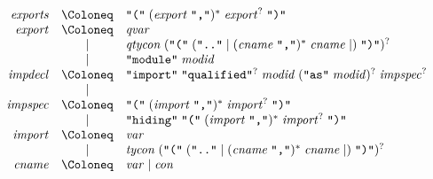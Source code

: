 \begin{align*}
  \begin{array}{rcl}
    \mathit{exports}
    & \Coloneq & \text{\texttt{\textquotedbl(\textquotedbl}}\; (\mathit{export}\; \text{\texttt{\textquotedbl,\textquotedbl}})^*\; \mathit{export}^?\; \text{\texttt{\textquotedbl)\textquotedbl}} \\
    \mathit{export}
    & \Coloneq & \mathit{qvar} \\
    & \mid & \mathit{qtycon}\; (\text{\texttt{\textquotedbl(\textquotedbl}}\; (\text{\texttt{\textquotedbl..\textquotedbl}} \mid (\mathit{cname}\; \text{\texttt{\textquotedbl,\textquotedbl}})^*\; \mathit{cname} \mid )\; \text{\texttt{\textquotedbl)\textquotedbl}})^? \\
    & \mid & \text{\texttt{\textquotedbl module\textquotedbl}}\; \mathit{modid} \\
    \mathit{impdecl}
    & \Coloneq & \text{\texttt{\textquotedbl import\textquotedbl}}\; \text{\texttt{\textquotedbl qualified\textquotedbl}}^?\; \mathit{modid}\; (\text{\texttt{\textquotedbl as\textquotedbl}}\; \mathit{modid})^?\; \mathit{impspec}^? \\
    & \mid & \\
    \mathit{impspec}
    & \Coloneq & \text{\texttt{\textquotedbl(\textquotedbl}}\; (\mathit{import}\; \text{\texttt{\textquotedbl,\textquotedbl}})^*\; \mathit{import}^?\; \text{\texttt{\textquotedbl)\textquotedbl}} \\
    & \mid & \text{\texttt{\textquotedbl hiding\textquotedbl}}\;\text{\texttt{\textquotedbl(\textquotedbl}}\; (\mathit{import}\; \text{\texttt{\textquotedbl,\textquotedbl}})^*\; \mathit{import}^?\; \text{\texttt{\textquotedbl)\textquotedbl}} \\
    \mathit{import}
    & \Coloneq & \mathit{var} \\
    & \mid & \mathit{tycon}\; (\text{\texttt{\textquotedbl(\textquotedbl}}\; (\text{\texttt{\textquotedbl..\textquotedbl}} \mid (\mathit{cname}\; \text{\texttt{\textquotedbl,\textquotedbl}})^*\; \mathit{cname} \mid )\; \text{\texttt{\textquotedbl)\textquotedbl}})^? \\
    \mathit{cname}
    & \Coloneq & \mathit{var} \mid \mathit{con}
  \end{array}
\end{align*}

